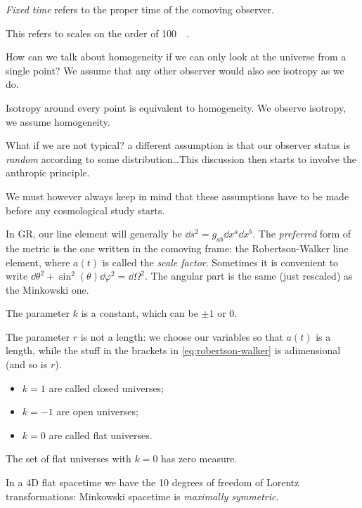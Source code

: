 \documentclass[main.tex]{subfiles}
\begin{document}
\emph{Fixed time} refers to the proper time of the comoving observer.

This refers to scales on the order of \SI{100}{\mega\parsec}.

How can we talk about homogeneity if we can only look at the universe from a single point? We assume that any other observer would also see isotropy as we do.

Isotropy around every point is equivalent to homogeneity. We observe isotropy, we assume homogeneity.

What if we are not typical? a different assumption is that our observer status is \emph{random} according to some distribution\dots This discussion then starts to involve the anthropic principle.

We must however always keep in mind that these assumptions have to be made before any cosmological study starts.

In GR, our line element will generally be \(\dd{s^2} = g_{ab} \dd{x^a} \dd{x^b} \). The \emph{preferred} form of the metric is the one written in the comoving frame: the Robertson-Walker line element,
%
%
where \(a(t)\) is called the \emph{scale factor}. Sometimes it is convenient to write \(\dd{\theta^2} + \sin^2(\theta) \dd{\varphi^2} = \dd{\Omega^2}\).
The angular part is the same (just rescaled) as the Minkowski one.

The parameter \(k\) is a constant, which can be \(\pm 1\) or \(0\).

The parameter \(r\) is not a length: we choose our variables so that \(a(t)\)  is a length, while the stuff in the brackets in \eqref{eq:robertson-walker} is adimensional (and so is \(r\)).

\begin{itemize}
    \item \(k=1\) are called closed universes;
    \item \(k=-1\) are open universes;
    \item \(k=0\) are called flat universes.
\end{itemize}

The set of flat universes with \(k=0\) has zero measure.

In a 4D flat spacetime we have the 10 degrees of freedom of Lorentz transformations: Minkowski spacetime is \emph{maximally symmetric}.
\end{document}
